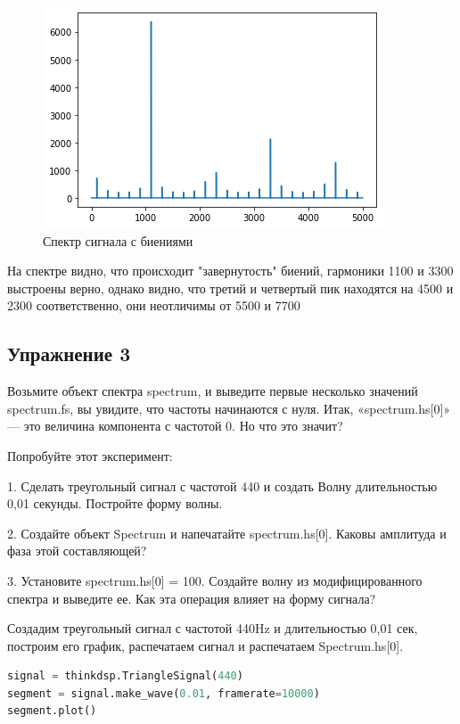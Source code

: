 \begin{figure}[H]
	\begin{center}
		\includegraphics[scale=1]{fig/lab02/lab02_5.png}
		\caption{Спектр сигнала с биениями}
	\end{center}
\end{figure}

На спектре видно, что происходит "завернутость" биений, гармоники 1100 и 3300 выстроены верно, однако видно, что третий и четвертый пик находятся на 4500 и 2300 соответственно, они неотличимы от 5500 и 7700


\subsection{Упражнение 3}

Возьмите объект спектра spectrum, и выведите первые несколько значений spectrum.fs, вы увидите, что частоты начинаются с нуля. Итак, «spectrum.hs[0]» — это величина компонента с частотой 0. Но что это значит?

\noindent Попробуйте этот эксперимент:

1. Сделать треугольный сигнал с частотой 440 и создать Волну длительностью 0,01 секунды. Постройте форму волны.

2. Создайте объект Spectrum и напечатайте spectrum.hs[0]. Каковы амплитуда и фаза этой составляющей?

3. Установите spectrum.hs[0] = 100. Создайте волну из модифицированного спектра и выведите ее. Как эта операция влияет на форму сигнала?

Создадим треугольный сигнал с частотой 440Hz и длительностью 0,01 сек, построим его график, распечатаем сигнал и распечатаем Spectrum.hs[0].


\begin{lstlisting}[language=Python]
signal = thinkdsp.TriangleSignal(440)
segment = signal.make_wave(0.01, framerate=10000)
segment.plot()
\end{lstlisting}

